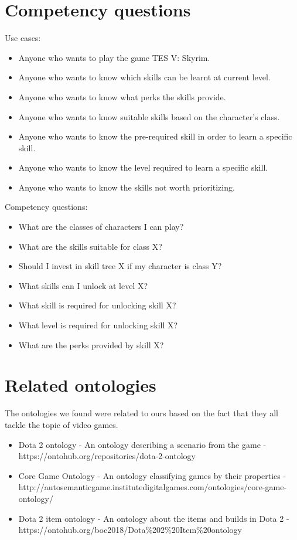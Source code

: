 \documentclass[a4paper,12pt]{report}
\begin{document}
\section{Competency questions}
Use cases:
\begin{itemize}
 \item Anyone who wants to play the game TES V: Skyrim.
 \item Anyone who wants to know which skills can be learnt at current level.
 \item Anyone who wants to know what perks the skills provide.
 \item Anyone who wants to know suitable skills based on the character's class.
 \item Anyone who wants to know the pre-required skill in order to learn a specific skill.
 \item Anyone who wants to know the level required to learn a specific skill.
 \item Anyone who wants to know the skills not worth prioritizing. 
\end{itemize}
\hfill \break
Competency questions:
\begin{itemize}
  \item What are the classes of characters I can play?
  \item What are the skills suitable for class X?
  \item Should I invest in skill tree X if my character is class Y?
  \item What skills can I unlock at level X?
  \item What skill is required for unlocking skill X?
  \item What level is required for unlocking skill X?
  \item What are the perks provided by skill X?
\end{itemize}


\clearpage
\section{Related ontologies}
The ontologies we found were related to ours based on the fact that they all tackle the topic of video games.
\begin{itemize}
    \item Dota 2 ontology - An ontology describing a scenario from the game - https://ontohub.org/repositories/dota-2-ontology
    \item Core Game Ontology - An ontology classifying games by their properties - http://autosemanticgame.institutedigitalgames.com/ontologies/core-game-ontology/
    \item Dota 2 item ontology - An ontology about the items and builds in Dota 2 - https://ontohub.org/boc2018/Dota\%202\%20Item\%20ontology
\end{itemize}
\end{document}
